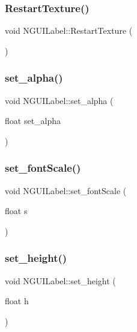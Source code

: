 \subsubsection{\texorpdfstring{Restart\+Texture()}{RestartTexture()}}
{\footnotesize\ttfamily void N\+G\+U\+I\+Label\+::\+Restart\+Texture (\begin{DoxyParamCaption}{ }\end{DoxyParamCaption})}

\hypertarget{class_n_g_u_i_label_a30f0d9a7f761b978558852fd6d15659d}{}\label{class_n_g_u_i_label_a30f0d9a7f761b978558852fd6d15659d} 
\subsubsection{\texorpdfstring{set\+\_\+alpha()}{set\_alpha()}}
{\footnotesize\ttfamily void N\+G\+U\+I\+Label\+::set\+\_\+alpha (\begin{DoxyParamCaption}\item[{float}]{set\+\_\+alpha }\end{DoxyParamCaption})}

\hypertarget{class_n_g_u_i_label_a17c4432c9809115eba55a6e7584493e9}{}\label{class_n_g_u_i_label_a17c4432c9809115eba55a6e7584493e9} 
\subsubsection{\texorpdfstring{set\+\_\+font\+Scale()}{set\_fontScale()}}
{\footnotesize\ttfamily void N\+G\+U\+I\+Label\+::set\+\_\+font\+Scale (\begin{DoxyParamCaption}\item[{float}]{s }\end{DoxyParamCaption})}

\hypertarget{class_n_g_u_i_label_ac5a99ecea5089455f423693f70228218}{}\label{class_n_g_u_i_label_ac5a99ecea5089455f423693f70228218} 
\subsubsection{\texorpdfstring{set\+\_\+height()}{set\_height()}}
{\footnotesize\ttfamily void N\+G\+U\+I\+Label\+::set\+\_\+height (\begin{DoxyParamCaption}\item[{float}]{h }\end{DoxyParamCaption})}

